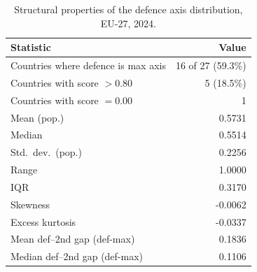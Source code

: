 \begin{table}[htbp]
\centering
\caption{Structural properties of the defence axis distribution, EU-27, 2024.}
\label{tab:defence-structural}
\begin{tabular}{@{}lr@{}}
\toprule
{\textbf{Statistic}} & {\textbf{Value}} \\
\midrule
  Countries where defence is max axis & 16 of 27 (59.3\%) \\
  Countries with score $> 0.80$ & 5 (18.5\%) \\
  Countries with score $= 0.00$ & 1 \\
  Mean (pop.) & 0.5731 \\
  Median & 0.5514 \\
  Std.\ dev.\ (pop.) & 0.2256 \\
  Range & 1.0000 \\
  IQR & 0.3170 \\
  Skewness & -0.0062 \\
  Excess kurtosis & -0.0337 \\
  Mean def--2nd gap (def-max) & 0.1836 \\
  Median def--2nd gap (def-max) & 0.1106 \\
\bottomrule
\end{tabular}
\end{table}